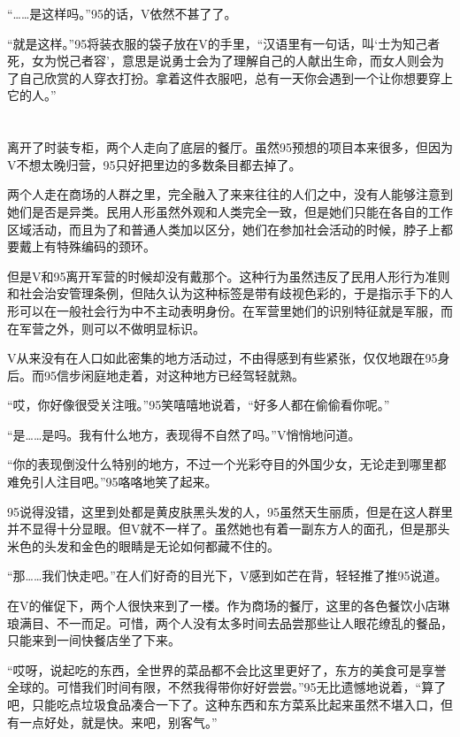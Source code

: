 “……是这样吗。”95的话，V依然不甚了了。

“就是这样。”95将装衣服的袋子放在V的手里，“汉语里有一句话，叫‘士为知己者死，女为悦己者容’，意思是说勇士会为了理解自己的人献出生命，而女人则会为了自己欣赏的人穿衣打扮。拿着这件衣服吧，总有一天你会遇到一个让你想要穿上它的人。”



\section*{}

离开了时装专柜，两个人走向了底层的餐厅。虽然95预想的项目本来很多，但因为V不想太晚归营，95只好把里边的多数条目都去掉了。

两个人走在商场的人群之里，完全融入了来来往往的人们之中，没有人能够注意到她们是否是异类。民用人形虽然外观和人类完全一致，但是她们只能在各自的工作区域活动，而且为了和普通人类加以区分，她们在参加社会活动的时候，脖子上都要戴上有特殊编码的颈环。

但是V和95离开军营的时候却没有戴那个。这种行为虽然违反了民用人形行为准则和社会治安管理条例，但陆久认为这种标签是带有歧视色彩的，于是指示手下的人形可以在一般社会行为中不主动表明身份。在军营里她们的识别特征就是军服，而在军营之外，则可以不做明显标识。

V从来没有在人口如此密集的地方活动过，不由得感到有些紧张，仅仅地跟在95身后。而95信步闲庭地走着，对这种地方已经驾轻就熟。

“哎，你好像很受关注哦。”95笑嘻嘻地说着，“好多人都在偷偷看你呢。”

“是……是吗。我有什么地方，表现得不自然了吗。”V悄悄地问道。

“你的表现倒没什么特别的地方，不过一个光彩夺目的外国少女，无论走到哪里都难免引人注目吧。”95咯咯地笑了起来。

95说得没错，这里到处都是黄皮肤黑头发的人，95虽然天生丽质，但是在这人群里并不显得十分显眼。但V就不一样了。虽然她也有着一副东方人的面孔，但是那头米色的头发和金色的眼睛是无论如何都藏不住的。

“那……我们快走吧。”在人们好奇的目光下，V感到如芒在背，轻轻推了推95说道。

在V的催促下，两个人很快来到了一楼。作为商场的餐厅，这里的各色餐饮小店琳琅满目、不一而足。可惜，两个人没有太多时间去品尝那些让人眼花缭乱的餐品，只能来到一间快餐店坐了下来。

“哎呀，说起吃的东西，全世界的菜品都不会比这里更好了，东方的美食可是享誉全球的。可惜我们时间有限，不然我得带你好好尝尝。”95无比遗憾地说着，“算了吧，只能吃点垃圾食品凑合一下了。这种东西和东方菜系比起来虽然不堪入口，但有一点好处，就是快。来吧，别客气。”

